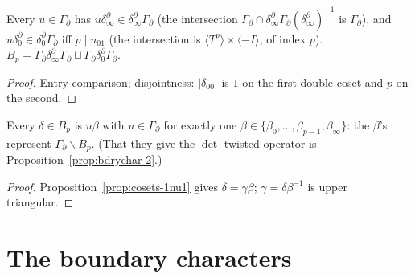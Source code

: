 \begin{proposition}[$\nu=1$: two double cosets]\label{prop:bdrycosets-3}
  \leanok
  Every $u\in\Gamma_\partial$ has $u\delta^\partial_\infty\in\delta^\partial_\infty\Gamma_\partial$ (the intersection
  $\Gamma_\partial\cap\delta^\partial_\infty\Gamma_\partial(\delta^\partial_\infty)^{-1}$ is $\Gamma_\partial$), and
  $u\delta^\partial_0\in\delta^\partial_0\Gamma_\partial$ iff $p\mid u_{01}$ (the intersection is $\langle T^p\rangle\times\langle-I\rangle$, of
  index $p$). $B_p=\Gamma_\partial\delta^\partial_\infty\Gamma_\partial\sqcup\Gamma_\partial\delta^\partial_0\Gamma_\partial$.
\end{proposition}
\begin{proof}
  \leanok
  Entry comparison; disjointness: $|\delta_{00}|$ is $1$ on the first double coset and $p$ on the second.
\end{proof}

\begin{proposition}[$\nu=1$: the right cosets are the wrong ones]\label{prop:bdrycosets-4}
  \leanok
  Every $\delta\in B_p$ is $u\beta$ with $u\in\Gamma_\partial$ for exactly one $\beta\in\{\beta_0,\dots,\beta_{p-1},\beta_\infty\}$: the
  $\beta$'s represent $\Gamma_\partial\backslash B_p$. (That they give the $\det$-twisted operator is
  Proposition~\ref{prop:bdrychar-2}.)
\end{proposition}
\begin{proof}
  \leanok
  Proposition~\ref{prop:cosets-1nu1} gives $\delta=\gamma\beta$; $\gamma=\delta\beta^{-1}$ is upper triangular.
\end{proof}

\section{The boundary characters}

